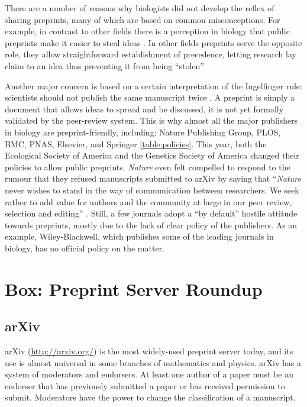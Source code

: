 \documentclass[10pt]{article}
\begin{document}
There are a number of reasons why biologists did not develop the reflex of
sharing preprints, many of which are based on common misconceptions. For
example, in contrast to other fields there is a perception in biology that
public preprints make it easier to steal ideas \cite{gin11}. In other fields
preprints serve the opposite role, they allow straightforward establishment of
precedence, letting research lay claim to an idea thus preventing it from being
``stolen'' \cite{gin11}

Another major concern is based on a certain interpretation of the Ingelfinger
rule: scientists should not publish the same manuscript twice \cite{alt96}. A
preprint is simply a document that allows ideas to spread and be discussed, it
is not yet formally validated by the peer-review system. This is why almost all
the major publishers in biology are preprint-friendly, including: Nature
Publishing Group, PLOS, BMC, PNAS, Elsevier, and Springer \ref{table:policies}.
This year, both the Ecological Society of America and the Genetics Society of
America changed their policies to allow public preprints. \emph{Nature} even
felt compelled to respond to the rumour that they refused manuscripts submitted
to arXiv by saying that ``\emph{Nature} never wishes to stand in the way of
communication between researchers. We seek rather to add value for authors and
the community at large in our peer review, selection and editing'' \cite{nat05}.
Still, a few journals adopt a ``by default'' hostile attitude towards preprints,
mostly due to the lack of clear policy of the publishers. As an example,
Wiley-Blackwell, which publishes some of the leading journals in biology, has no
official policy on the matter.

\section*{Box: Preprint Server Roundup}


\subsection*{arXiv}

arXiv (\url{http://arxiv.org/}) is the most widely-used preprint server today,
and its use is almost universal in some branches of mathematics and physics.
arXiv has a system of moderators and endorsers. At least one author of a paper
must be an endorser that has previously submitted a paper or has received
permission to submit.  Moderators have the power to change the classification of
a manuscript.
\end{document}

